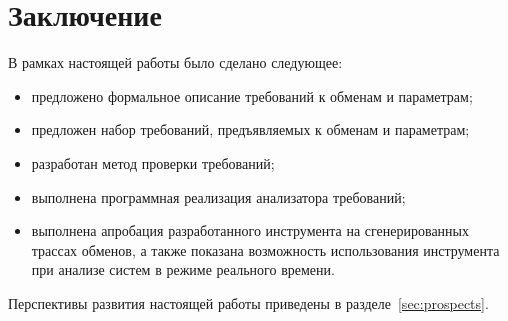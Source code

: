\section{Заключение}

В рамках настоящей работы было сделано следующее:

\begin{itemize}
 \item предложено формальное описание требований к обменам и параметрам;
 \item предложен набор требований, предъявляемых к обменам и параметрам;
 \item разработан метод проверки требований;
 \item выполнена программная реализация анализатора требований;
 \item выполнена апробация разработанного инструмента на сгенерированных 
трассах обменов, а также показана возможность использования инструмента при 
анализе систем в режиме реального времени.
\end{itemize}

Перспективы развития настоящей работы приведены в разделе~\ref{sec:prospects}.

